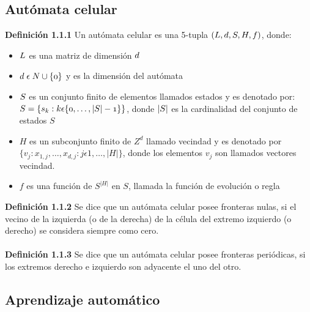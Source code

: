 \subsection{Autómata celular}

\textbf{Definición 1.1.1} Un autómata celular es una 5-tupla $\mathnormal{(L, d, S, H, f)}$, donde:
\begin{itemize}
	\item $\mathnormal{L}$ es una matriz de dimensión $\mathnormal{d}$
	\item $\mathnormal{d\; \epsilon\; N\cup\{0\}}$ y es la dimensión del autómata
	\item $\mathnormal{S}$ es un conjunto finito de elementos llamados estados y es denotado por:
	\\
	$\mathnormal{S=\{s_{k}:k \epsilon \{0,\dots,|S|-1\}\}}$, donde $\mathnormal{|S|}$ es la cardinalidad del conjunto de estados $S$
	\item $H$ es un subconjunto finito de $Z^{d}$ llamado vecindad y es denotado por $\{v_{j}:x_{1,j},\dots,x_{d,j}:j\epsilon1,\dots,|H|\}$, donde los elementos $v_{j}$ son llamados vectores vecindad.
	\item $f$ es una función de $S^{|H|}$ en $S$, llamada la función de evolución o regla
\end{itemize}
\textbf{Definición 1.1.2} Se dice que un autómata celular posee fronteras nulas, si el vecino de la izquierda (o de la derecha) de la célula del extremo izquierdo (o derecho) se considera siempre como cero.
\\
\\
\textbf{Definición 1.1.3} Se dice que un autómata celular posee fronteras periódicas, si los extremos derecho e izquierdo son adyacente el uno del otro.

\subsection{Aprendizaje automático}

